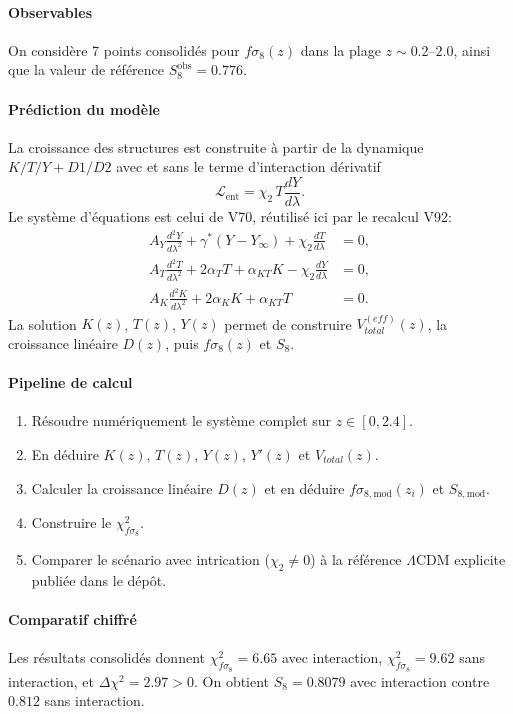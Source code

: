 \documentclass[11pt,a4paper]{article}
\newcommand{\Lent}{\mathcal{L}_{\mathrm{ent}}}
\begin{document}
\paragraph{Observables}
On considère 7 points consolidés pour $f\sigma_8(z)$ dans la plage $z \sim 0.2$--$2.0$, ainsi que la valeur de référence $S_8^{\mathrm{obs}}=0.776$.

\paragraph{Prédiction du modèle}
La croissance des structures est construite à partir de la dynamique $K/T/Y + D1/D2$ avec et sans le terme d'interaction dérivatif
\[
\Lent=\chi_2\,T\frac{dY}{d\lambda}.
\]
Le système d'équations est celui de V70, réutilisé ici par le recalcul V92:
\[
\begin{aligned}
 A_Y\frac{d^2Y}{d\lambda^2}+\gamma^*(Y-Y_\infty)+\chi_2\frac{dT}{d\lambda} &= 0, \\
 A_T\frac{d^2T}{d\lambda^2}+2\alpha_T T+\alpha_{KT}K-\chi_2\frac{dY}{d\lambda} &= 0, \\
 A_K\frac{d^2K}{d\lambda^2}+2\alpha_K K+\alpha_{KT}T &= 0.
\end{aligned}
\]
La solution $K(z)$, $T(z)$, $Y(z)$ permet de construire $V_{total}^{(eff)}(z)$, la croissance linéaire $D(z)$, puis $f\sigma_8(z)$ et $S_8$.

\paragraph{Pipeline de calcul}
\begin{enumerate}
	\item Résoudre numériquement le système complet sur $z \in [0,2.4]$.
	\item En déduire $K(z)$, $T(z)$, $Y(z)$, $Y'(z)$ et $V_{total}(z)$.
	\item Calculer la croissance linéaire $D(z)$ et en déduire $f\sigma_{8,\mathrm{mod}}(z_i)$ et $S_{8,\mathrm{mod}}$.
	\item Construire le $\chi^2_{f\sigma_8}$.
	\item Comparer le scénario avec intrication ($\chi_2 \neq 0$) à la référence $\Lambda$CDM explicite publiée dans le dépôt.
\end{enumerate}

\paragraph{Comparatif chiffré}
Les résultats consolidés donnent $\chi^2_{f\sigma_8}=6.65$ avec interaction, $\chi^2_{f\sigma_8}=9.62$ sans interaction, et $\Delta\chi^2=2.97>0$. On obtient $S_8=0.8079$ avec interaction contre $0.812$ sans interaction.
\end{document}
